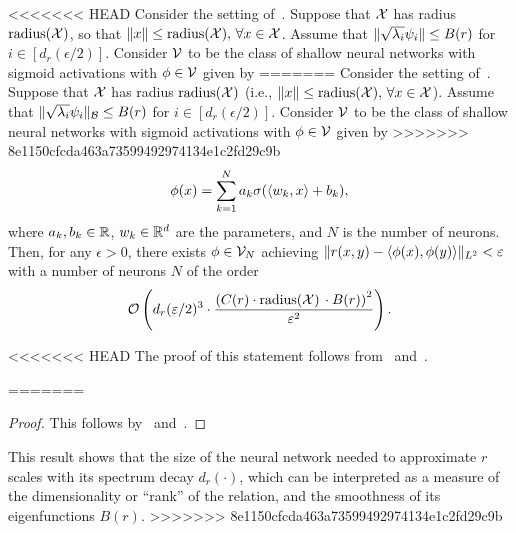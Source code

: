 \begin{corollary}\label{cor:sym_iprod_kernel_barron_neuron_bound}
<<<<<<< HEAD
	Consider the setting of~. Suppose that ${\mathcal{X}}$ has radius $\mathrm{radius}({\mathcal{X}})$, so that $\lVert x\rVert \leq \mathrm{radius}({\mathcal{X}}),\, \forall x \in {\mathcal{X}}$. Assume that $\lVert\sqrt{\lambda_i} \psi_i\rVert \leq B(r)$ for $i \in [d_r(\epsilon/2)]$. Consider ${\mathcal{V}}$ to be the class of shallow neural networks with sigmoid activations with $\phi \in {\mathcal{V}}$ given by
=======
	Consider the setting of~. Suppose that ${\mathcal{X}}$ has radius $\mathrm{radius}({\mathcal{X}})$ (i.e., $\lVert x\rVert \leq \mathrm{radius}({\mathcal{X}}),\, \forall x \in {\mathcal{X}}$). Assume that $\lVert\sqrt{\lambda_i} \psi_i\rVert_{{\mathcal{B}}} \leq B(r)$ for $i \in [d_r(\epsilon/2)]$. Consider ${\mathcal{V}}$ to be the class of shallow neural networks with sigmoid activations with $\phi \in {\mathcal{V}}$ given by
>>>>>>> 8e1150cfcda463a73599492974134e1c2fd29c9b
	\begin{equation*}
		\phi(x) = \sum_{k=1}^{N} a_k \sigma(\iprod{w_k}{x} + b_k),
	\end{equation*}
	where $a_k, b_k \in \mathbb{R}$, $w_k \in \mathbb{R}^{d}$ are the parameters, and $N$ is the number of neurons. Then, for any $\epsilon > 0$, there exists $\phi \in {\mathcal{V}}_N$ achieving $\lVert r(x,y) - \left \langle \phi(x), \phi(y) \right\rangle\rVert_{L^2} < \varepsilon$ with a number of neurons $N$ of the order
	\[{\mathcal{O}}\left(d_r(\varepsilon / 2)^3 \cdot \frac{\left(C(r) \cdot \mathrm{radius}({\mathcal{X}})\, \cdot B(r)\right)^2}{\varepsilon^2}\right).\]
\end{corollary}
<<<<<<< HEAD
The proof of this statement follows from~ and~\textcite{barronUniversalApproximation1993}.

=======
\begin{proof}
	This follows by~ and~\textcite{barronUniversalApproximation1993}.
\end{proof}

This result shows that the size of the neural network needed to approximate $r$ scales with its spectrum decay $d_r(\cdot)$, which can be interpreted as a measure of the dimensionality or ``rank'' of the relation, and the smoothness of its eigenfunctions $B(r)$.
>>>>>>> 8e1150cfcda463a73599492974134e1c2fd29c9b
